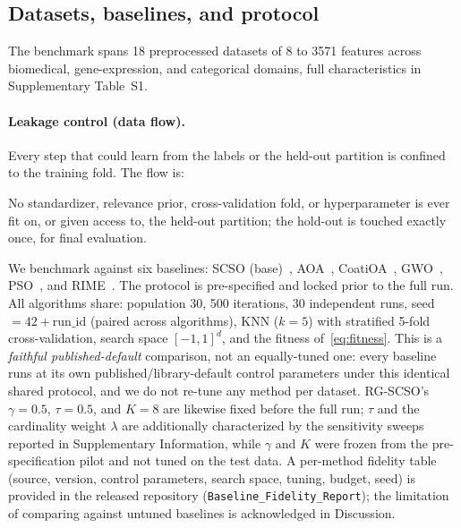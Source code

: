 \documentclass[preprint,3p,times]{elsarticle}
\begin{document}
\subsection{Datasets, baselines, and protocol}
The benchmark spans 18 preprocessed datasets of 8 to
3571 features across biomedical, gene-expression, and categorical
domains, full characteristics in Supplementary Table~S1.

\paragraph{Leakage control (data flow).} Every step that could learn from
the labels or the held-out partition is confined to the training fold. The
flow is:
\begin{center}
\footnotesize
{}
\end{center}
No standardizer, relevance prior, cross-validation fold, or hyperparameter is
ever fit on, or given access to, the held-out partition; the hold-out is
touched exactly once, for final evaluation.

We benchmark against six baselines: SCSO (base)~\cite{scso},
AOA~\cite{aoa}, CoatiOA~\cite{coa}, GWO~\cite{gwo}, PSO~\cite{pso}, and
RIME~\cite{rime}. The protocol is pre-specified and locked prior to the full
run. All algorithms share: population 30, 500 iterations, 30 independent
runs, seed $=42+\mathrm{run\_id}$ (paired across algorithms), KNN ($k=5$)
with stratified 5-fold cross-validation, search space $[-1,1]^d$, and the
fitness of~\eqref{eq:fitness}. This is a \emph{faithful published-default}
comparison, not an equally-tuned one: every baseline runs at its own
published/library-default control parameters under this identical shared
protocol, and we do not re-tune any method per dataset. RG-SCSO's
$\gamma=0.5$, $\tau=0.5$, and $K=8$ are likewise fixed before the full run;
$\tau$ and the cardinality weight $\lambda$ are additionally characterized by
the sensitivity sweeps reported in Supplementary Information, while $\gamma$
and $K$ were frozen from the pre-specification pilot and not tuned on the test
data. A per-method fidelity table (source, version, control parameters, search
space, tuning, budget, seed) is provided in the released repository
(\texttt{Baseline\_Fidelity\_Report}); the limitation of comparing against
untuned baselines is acknowledged in Discussion.
\end{document}
